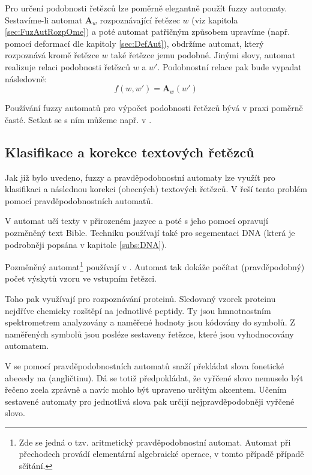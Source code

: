 Pro určení podobnosti řetězců lze poměrně elegantně použít fuzzy automaty. Sestavíme-li automat $\mathbf{A}_w$ rozpoznávající řetězec $w$ (viz kapitola \ref{sec:FuzAutRozpOme}) a poté automat patřičným způsobem upravíme (např. pomocí deformací dle kapitoly \ref{sec:DefAut}), obdržíme automat, který rozpoznává kromě řetězce $w$ také řetězce jemu podobné. Jinými slovy, automat realizuje relaci podobnosti řetězců $w$ a $w'$. Podobnostní relace pak bude vypadat následovně:
$$
   f(w, w') = \mathbf{A}_w(w')
$$

Používání fuzzy automatů pro výpočet podobnosti řetězců bývá v praxi poměrně časté. Setkat se s ním můžeme např. v \cite{AndAbdAsm-ApprPattMatcFuzzLog, Gar+-DefFuzAutCorImpStrFuzSym, Ast+-ImpStrMaExpUsDefFuzAut, RamGir-ConvFinAutFuzzAutStrComp, SetWar-FuzzAutPattMatc}.

\subsection{Klasifikace a korekce textových řetězců}
Jak již bylo uvedeno, fuzzy a pravděpodobnostní automaty lze využít pro klasifikaci a následnou korekci (obecných) textových řetězců. V \cite{HigOnc-ComMosProStrProFiStaMa, Mar+-ProAriAutApp, Her-ProAriAutAppSoComFraBioSeqAna, YorSinTis-PowAmnLeaPrAuVarMemLen, Ron-AutLeaApp} řeší tento problém pomocí pravděpodobnostních automatů.

V \cite{Ron-AutLeaApp} automat učí texty v přirozeném jazyce a poté s jeho pomocí opravují pozměněný text Bible. Techniku používají také pro segementaci DNA (která je podrobněji popsána v kapitole \ref{subs:DNA}).

Pozměněný automat\footnote{Zde se jedná o tzv. aritmetický pravděpodobnostní automat. Automat při přechodech provádí elementární algebraické operace, v tomto případě případě sčítání.} používají v \cite{Mar+-ProAriAutApp, Her-ProAriAutAppSoComFraBioSeqAna}. Automat tak dokáže počítat (pravděpodobný) počet výskytů vzoru ve vstupním řetězci.

Toho pak využívají pro rozpoznávání proteinů. Sledovaný vzorek proteinu nejdříve chemicky rozštěpí na jednotlivé peptidy. Ty jsou hmnotnostním spektrometrem analyzovány a naměřené hodnoty jsou kódovány do symbolů. Z naměřených symbolů jsou posléze sestaveny řetězce, které jsou vyhodnocovány automatem.

V \cite{MohPerRoe-WeiFinStaTraSpeRec, BahJel-DecChaWinDelSubApSpeRec} se pomocí pravděpodobnostních automatů snaží překládat slova fonetické abecedy na  (angličtinu). Dá se totiž předpokládat, že vyřčené slovo nemuselo být řečeno zcela zprávně a navíc mohlo být upraveno určitým akcentem. Učením sestavené automaty pro jednotlivá slova pak určijí nejpravděpodobněji vyřčené slovo.

